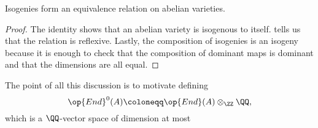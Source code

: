 \documentclass{amsart}
\begin{document}
\begin{corollary}
	Isogenies form an equivalence relation on abelian varieties.
\end{corollary}
\begin{proof}
	The identity shows that an abelian variety is isogenous to itself.  tells us that the relation is reflexive. Lastly, the composition of isogenies is an isogeny because it is enough to check that the composition of dominant maps is dominant and that the dimensions are all equal.
\end{proof}
The point of all this discussion is to motivate defining
\[\op{End}^0(A)\coloneqq\op{End}(A)\otimes_\ZZ\QQ,\]
which is a $\QQ$-vector space of dimension at most

\printbibliography[title={References}]
\end{document}

